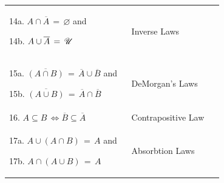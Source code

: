 \begin{tabular}{p{0.4\linewidth}|p{0.3\linewidth}}
14a. $A\cap\overline{A}\, =\, \varnothing$ and\par 14b. $A\cup\overline{A}\, =\, \mbox{$\mathscr{U}\ $}$ & Inverse Laws \tabularnewline

15a. $\overline{\left(A\cap B\right)}\, =\, \overline{A}\cup\overline{B}$ and \par
15b. $\overline{\left(A\cup B\right)}\, =\, \overline{A}\cap\overline{B}$ & DeMorgan's Laws\tabularnewline

16. $A\subseteq B\, \Leftrightarrow \overline{B}\subseteq\overline{A}$ & Contrapositive Law \tabularnewline

17a. $A\cup(A\cap B)\, =\, A$ and\par 17b. $A\cap(A\cup B)\, =\, A$ & Absorbtion Laws \tabularnewline
\end{tabular}